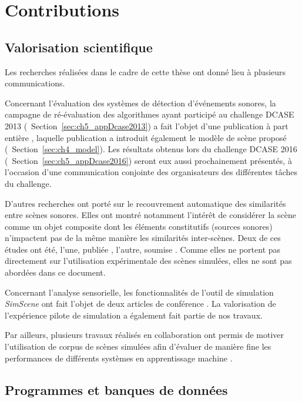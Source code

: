 \section{Contributions}

\subsection{Valorisation scientifique}

Les recherches réalisées dans le cadre de cette thèse ont donné lieu à plusieurs communications.

Concernant l'évaluation des systèmes de détection d'événements sonores, la campagne de ré-évaluation des algorithmes ayant participé au challenge DCASE 2013 (\cf~Section~\ref{sec:ch5_appDcase2013}) a fait l'objet d'une publication à part entière \citep{lafay2016morphological}, laquelle publication a introduit également le modèle de scène proposé (\cf~Section~\ref{sec:ch4_model}). Les résultats obtenus lors du challenge DCASE 2016 (\cf~Section~\ref{sec:ch5_appDcase2016}) seront eux aussi prochainement présentés, à l'occasion d'une communication conjointe des organisateurs des différentes tâches du challenge.

D'autres recherches ont porté sur le recouvrement automatique des similarités entre scènes sonores. Elles ont montré notamment l'intérêt de considérer la scène comme un objet composite dont les éléments constitutifs (sources sonores) n'impactent pas de la même manière les similarités inter-scènes. Deux de ces études ont été, l'une, publiée \citep{lagrange2015bag}, l'autre, soumise \citep{Lostenlen2016ScatteringObjet}. Comme elles ne portent pas directement sur l'utilisation expérimentale des scènes simulées, elles ne sont pas abordées dans ce document.

Concernant l'analyse sensorielle, les fonctionnalités de l'outil de simulation \emph{SimScene} ont fait l'objet de deux articles de conférence  \citep{rossignol2015simscene,lafay2016JAES}. La valorisation de l'expérience pilote de simulation \citep{lafay2014new} a également fait partie de nos travaux.

Par ailleurs, plusieurs travaux réalisés en collaboration ont permis de motiver l'utilisation de corpus de scènes simulées afin d'évaluer de manière fine les performances de différents systèmes en apprentissage machine \citep{benetos2016detectionLDC,rossignol2015alternate,benetos2016detection}.

\subsection{Programmes et banques de données}

